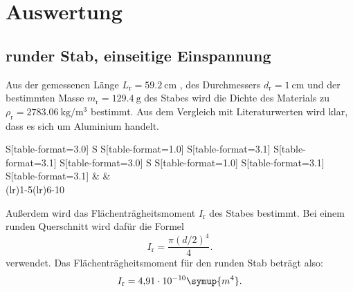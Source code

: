 \section{Auswertung}
\label{sec:Auswertung}

\subsection{runder Stab, einseitige Einspannung}

Aus der gemessenen Länge $L_{\text{r}}= \qty{59,2}{\centi\meter}$ , des Durchmessers $d_{\text{r}}= \qty{1}{\centi\meter}$ und der bestimmten Masse $m_{\text{r}}= \qty{129,4}{\gram}$
 des Stabes wird die Dichte des Materials zu $\rho_{\text{r}} = \qty{2783,06}{\kilo\gram\per\cubic\meter}$ bestimmt.
Aus dem Vergleich mit Literaturwerten \cite{Dichte} wird klar, dass es sich um Aluminium handelt.
\begin{table}
  \centering
  \caption{Maße des runden und des eckigen Stabes}
  \begin{tabular}{S[table-format=3.0]
      S
      S[table-format=1.0]
      S[table-format=3.1]
      S[table-format=3.1]
      S[table-format=3.0]
      S
      S[table-format=1.0]
      S[table-format=3.1]
      S[table-format=3.1]}
    \toprule
    &  &  \\
    \cmidrule(lr){1-5}\cmidrule(lr){6-10}
    
  \end{tabular}
\end{table}


Außerdem wird das Flächenträgheitsmoment $I_{\text{r}}$  des Stabes bestimmt. Bei einem runden Querschnitt wird dafür die Formel \cite{flaeche}
\begin{equation*}
  I_{\text{r}} = \frac{\pi (d/2)^4}{4}.
\end{equation*} verwendet.
Das Flächenträgheitsmoment für den runden Stab beträgt also: 
\begin{equation*}
  I_{\text{r}} = \num{4,91e-10}\symup{m^4}.
\end{equation*}

